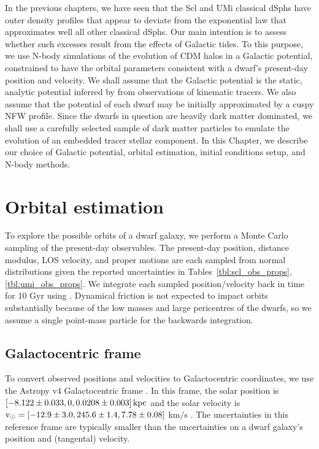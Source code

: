 In the previous chapters, we have seen that the Scl and UMi classical
dSphs have outer density profiles that appear to deviate from the
exponential law that approximates well all other classical dSphs. Our
main intention is to assess whether such excesses result from the
effects of Galactic tides. To this purpose, we use N-body simulations of
the evolution of CDM halos in a Galactic potential, constrained to have
the orbital parameters consistent with a dwarf's present-day position
and velocity. We shall assume that the Galactic potential is the static,
analytic potential inferred by \citet{mcmillan2011} from observations of
kinematic tracers. We also assume that the potential of each dwarf may
be initially approximated by a cuspy NFW profile. Since the dwarfs in
question are heavily dark matter dominated, we shall use a carefully
selected sample of dark matter particles to emulate the evolution of an
embedded tracer stellar component. In this Chapter, we describe our
choice of Galactic potential, orbital estimation, initial conditions
setup, and N-body methods.

\section{Orbital estimation}\label{sec:orbital_estimation}

To explore the possible orbits of a dwarf galaxy, we perform a Monte
Carlo sampling of the present-day observables. The present-day position,
distance modulus, LOS velocity, and proper motions are each sampled from
normal distributions given the reported uncertainties in
Tables~\ref{tbl:scl_obs_props}, \ref{tbl:umi_obs_props}. We integrate
each sampled position/velocity back in time for 10 Gyr using \agama{}
\citep{agama}. Dynamical friction is not expected to impact orbits
substantially because of the low masses and large pericentres of the
dwarfs, so we assume a single point-mass particle for the backwards
integration.

\subsection{Galactocentric frame}\label{galactocentric-frame}

To convert observed positions and velocities to Galactocentric
coordinates, we use the Astropy v4 Galactocentric frame
\citep{astropycollaboration+2022}. In this frame, the solar position is
\([-8.122 \pm 0.033, 0, 0.0208 \pm 0.003]\, {\rm kpc}\)
\citep{gravitycollaboration+2018, bennett+bovy2019} and the solar
velocity is \({\rm v}_\odot = [-12.9 \pm 3.0, 245.6 \pm 1.4, 7.78 \pm 0.08]\)
km/s
\citep{reid+brunthaler2004, drimmel+poggio2018, gravitycollaboration+2018}.
The uncertainties in this reference frame are typically smaller than the
uncertainties on a dwarf galaxy's position and (tangental) velocity.

